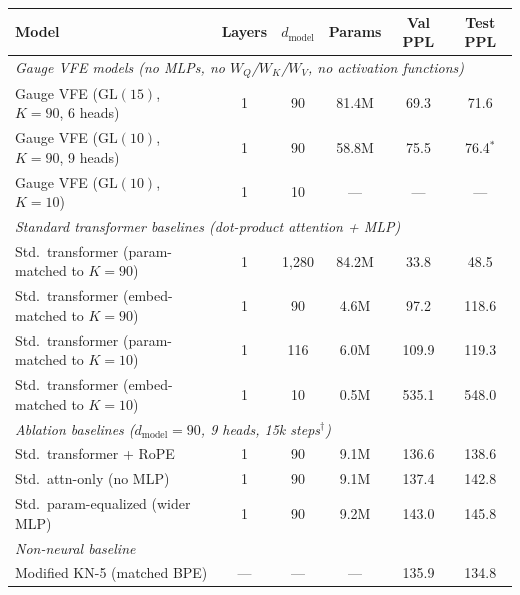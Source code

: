 \documentclass[twoside,11pt]{article}
\begin{document}
\begin{table}[h]
\centering
\begin{tabular}{lccccc}
\hline
\textbf{Model} & \textbf{Layers} & $d_{\text{model}}$ & \textbf{Params} & \textbf{Val PPL} & \textbf{Test PPL} \\
\hline
\multicolumn{6}{l}{\textit{Gauge VFE models (no MLPs, no $W_Q$/$W_K$/$W_V$, no activation functions)}} \\
Gauge VFE ($\mathrm{GL}(15)$, $K = 90$, 6 heads) & 1 & 90 & 81.4M & 69.3 & 71.6 \\
Gauge VFE ($\mathrm{GL}(10)$, $K=90$, 9 heads) & 1 & 90 & 58.8M & 75.5 & 76.4$^\ast$ \\
Gauge VFE ($\mathrm{GL}(10)$, $K = 10$) & 1 & 10 & --- & --- & --- \\
\hline
\multicolumn{6}{l}{\textit{Standard transformer baselines (dot-product attention + MLP)}} \\
Std.\ transformer (param-matched to $K = 90$) & 1 & 1{,}280 & 84.2M & 33.8 & 48.5 \\
Std.\ transformer (embed-matched to $K = 90$) & 1 & 90 & 4.6M & 97.2 & 118.6 \\
Std.\ transformer (param-matched to $K = 10$) & 1 & 116 & 6.0M & 109.9 & 119.3 \\
Std.\ transformer (embed-matched to $K = 10$) & 1 & 10 & 0.5M & 535.1 & 548.0 \\
\hline
\multicolumn{6}{l}{\textit{Ablation baselines ($d_{\text{model}} = 90$, 9 heads, 15k steps$^\dagger$)}} \\
Std.\ transformer + RoPE & 1 & 90 & 9.1M & 136.6 & 138.6 \\
Std.\ attn-only (no MLP) & 1 & 90 & 9.1M & 137.4 & 142.8 \\
Std.\ param-equalized (wider MLP) & 1 & 90 & 9.2M & 143.0 & 145.8 \\
\hline
\multicolumn{6}{l}{\textit{Non-neural baseline}} \\
Modified KN-5 (matched BPE) & --- & --- & --- & 135.9 & 134.8 \\
\hline
\end{tabular}

\end{table}
\end{document}

